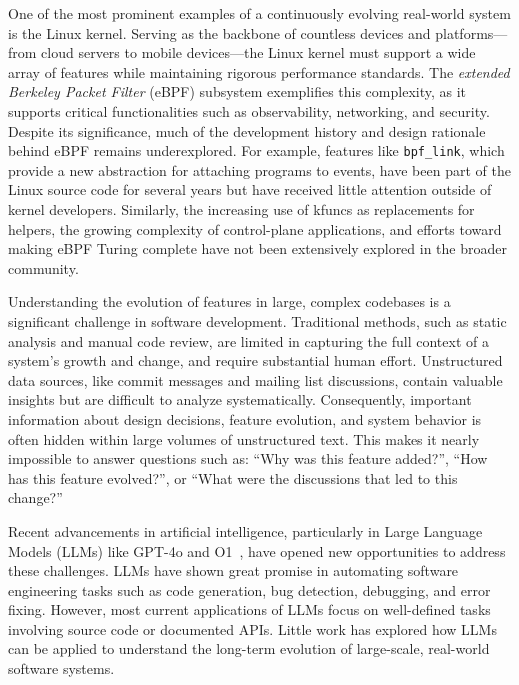 \documentclass[sigconf,review,anonymous]{acmart}
\begin{document}
One of the most prominent examples of a continuously evolving real-world system is the Linux kernel. Serving as the backbone of countless devices and platforms—from cloud servers to mobile devices—the Linux kernel must support a wide array of features while maintaining rigorous performance standards. The \textit{extended Berkeley Packet Filter} (eBPF)\cite{ebpf} subsystem exemplifies this complexity, as it supports critical functionalities such as observability\cite{shen2023network}, networking\cite{vieira2020fast}, and security\cite{deri2019combining}. Despite its significance, much of the development history and design rationale behind eBPF remains underexplored. For example, features like \texttt{bpf\_link}\cite{bpflink}, which provide a new abstraction for attaching programs to events, have been part of the Linux source code for several years but have received little attention outside of kernel developers. Similarly, the increasing use of kfuncs \cite{kfuncs} as replacements for helpers, the growing complexity of control-plane applications, and efforts toward making eBPF Turing complete have not been extensively explored in the broader community.

Understanding the evolution of features in large, complex codebases is a significant challenge in software development\cite{godfrey2008past,mens2008introduction}. Traditional methods, such as static analysis and manual code review, are limited in capturing the full context of a system's growth and change, and require substantial human effort. Unstructured data sources, like commit messages and mailing list discussions, contain valuable insights but are difficult to analyze systematically. Consequently, important information about design decisions, feature evolution, and system behavior is often hidden within large volumes of unstructured text. This makes it nearly impossible to answer questions such as: ``Why was this feature added?'', ``How has this feature evolved?'', or ``What were the discussions that led to this change?''

Recent advancements in artificial intelligence, particularly in Large Language Models (LLMs) like GPT-4o\cite{gpt4o} and O1~\cite{o1}, have opened new opportunities to address these challenges. LLMs have shown great promise in automating software engineering tasks such as code generation\cite{zheng2024kgent}, bug detection\cite{li2024enhancing}, debugging\cite{chen2023teaching}, and error fixing\cite{deligiannis2023fixing}. However, most current applications of LLMs focus on well-defined tasks involving source code or documented APIs. Little work has explored how LLMs can be applied to understand the long-term evolution of large-scale, real-world software systems.
\end{document}
